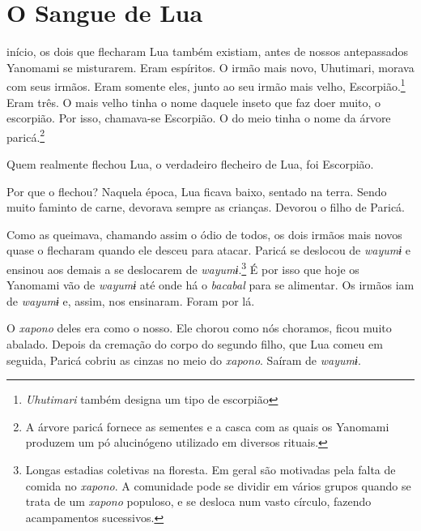 \chapter{O Sangue de Lua}
 
 início, os dois que flecharam Lua também existiam, antes de nossos
antepassados Yanomami se misturarem. Eram espíritos. O irmão mais novo,
Uhutimari, morava com seus irmãos. Eram somente eles, junto ao seu irmão
mais velho, Escorpião.\footnote{\textit{Uhutimari} também designa um tipo de escorpião} Eram três. O mais velho tinha o nome daquele
inseto que faz doer muito, o escorpião. Por isso, chamava-se Escorpião.
O do meio tinha o nome da árvore paricá.\footnote{A árvore paricá fornece as sementes e a casca com as quais os Yanomami
produzem um pó alucinógeno utilizado em diversos rituais.} 

Quem realmente flechou Lua, o verdadeiro flecheiro de Lua, foi
Escorpião. 

Por que o flechou? Naquela época, Lua ficava baixo, sentado na
terra. Sendo muito faminto de carne, devorava sempre as crianças.
Devorou o filho de Paricá. 


Como as queimava, chamando assim o ódio de todos, os dois irmãos
mais novos quase o flecharam quando ele desceu para
atacar. Paricá se deslocou de \textit{wayumɨ} e ensinou aos
demais a se deslocarem de \textit{wayumɨ}.\footnote{Longas estadias coletivas na floresta. Em geral são motivadas pela falta de comida no \textit{xapono}. A comunidade pode se dividir em vários grupos quando se trata de um \textit{xapono} populoso, e se desloca num vasto círculo, fazendo acampamentos sucessivos.} É por isso que hoje os Yanomami
vão de \textit{wayumɨ} até onde há o \textit{bacabal} para se alimentar. Os irmãos iam
de \textit{wayumɨ} e, assim, nos ensinaram. Foram por lá.

O \textit{xapono} deles era como o nosso. Ele chorou como nós choramos, ficou
muito abalado. Depois da cremação do corpo do segundo filho, que Lua
comeu em seguida, Paricá cobriu as cinzas no meio do \textit{xapono}. Saíram
de \textit{wayumɨ}. 

